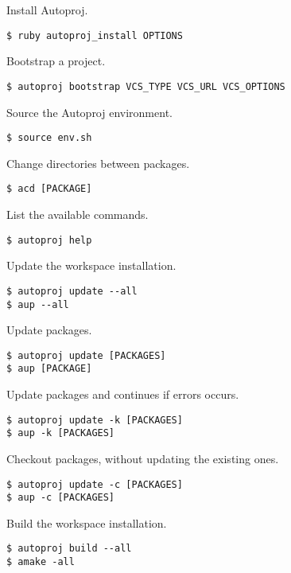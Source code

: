 \documentclass[9pt]{innovativeinnovation-cheatsheet}
\begin{document}
\begin{multicols*}{3}


Install Autoproj.
\begin{lstlisting}
$ ruby autoproj_install OPTIONS
\end{lstlisting}

Bootstrap a project.
\begin{lstlisting}
$ autoproj bootstrap VCS_TYPE VCS_URL VCS_OPTIONS
\end{lstlisting}


Source the Autoproj environment.
\begin{lstlisting}
$ source env.sh
\end{lstlisting}

Change directories between packages.
\begin{lstlisting}
$ acd [PACKAGE]
\end{lstlisting}

List the available commands.
\begin{lstlisting}
$ autoproj help
\end{lstlisting}


Update the workspace installation.
\begin{lstlisting}
$ autoproj update --all
$ aup --all
\end{lstlisting}

Update packages.
\begin{lstlisting}
$ autoproj update [PACKAGES]
$ aup [PACKAGE]
\end{lstlisting}

Update packages and continues if errors occurs.
\begin{lstlisting}
$ autoproj update -k [PACKAGES]
$ aup -k [PACKAGES]
\end{lstlisting}

Checkout packages, without updating the existing ones.
\begin{lstlisting}
$ autoproj update -c [PACKAGES]
$ aup -c [PACKAGES]
\end{lstlisting}


Build the workspace installation.
\begin{lstlisting}
$ autoproj build --all
$ amake -all
\end{lstlisting}


\end{multicols*}
\end{document}

